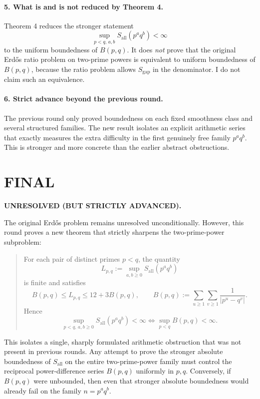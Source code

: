 \paragraph{5. What is and is not reduced by Theorem 4.}
Theorem 4 reduces the stronger statement
\[
\sup_{p<q,\,a,b}S_{\mathrm{all}}(p^a q^b)<\infty
\]
to the uniform boundedness of \(B(p,q)\). It does \emph{not} prove that the original Erd\H{o}s ratio problem on two-prime powers is equivalent to uniform boundedness of \(B(p,q)\), because the ratio problem allows \(S_{\mathrm{gap}}\) in the denominator. I do not claim such an equivalence.

\paragraph{6. Strict advance beyond the previous round.}
The previous round only proved boundedness on each fixed smoothness class and several structured families. The new result isolates an explicit arithmetic series that exactly measures the extra difficulty in the first genuinely free family \(p^a q^b\). This is stronger and more concrete than the earlier abstract obstructions.

\section{FINAL}

\textbf{UNRESOLVED (BUT STRICTLY ADVANCED).}

The original Erd\H{o}s problem remains unresolved unconditionally. However, this round proves a new theorem that strictly sharpens the two-prime-power subproblem:

\begin{quote}
For each pair of distinct primes \(p<q\), the quantity
\[
L_{p,q}:=\sup_{a,b\ge 0}S_{\mathrm{all}}(p^a q^b)
\]
is finite and satisfies
\[
B(p,q)\le L_{p,q}\le 12+3B(p,q),
\qquad
B(p,q):=\sum_{u\ge 1}\sum_{v\ge 1}\frac{1}{|p^u-q^v|}.
\]
Hence
\[
\sup_{p<q,\,a,b\ge 0}S_{\mathrm{all}}(p^a q^b)<\infty
\iff
\sup_{p<q}B(p,q)<\infty.
\]
\end{quote}

This isolates a single, sharply formulated arithmetic obstruction that was not present in previous rounds. Any attempt to prove the stronger absolute boundedness of \(S_{\mathrm{all}}\) on the entire two-prime-power family must control the reciprocal power-difference series \(B(p,q)\) uniformly in \(p,q\). Conversely, if \(B(p,q)\) were unbounded, then even that stronger absolute boundedness would already fail on the family \(n=p^a q^b\).

